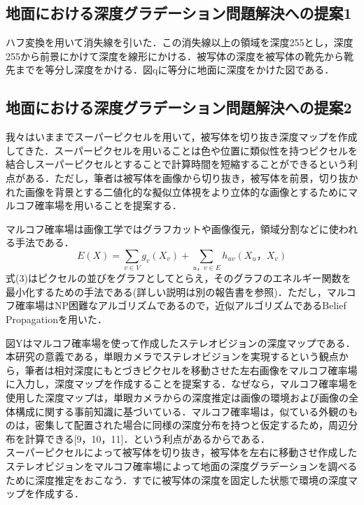 \documentclass[technicalreport]{ieicej}
\begin{document}

\subsection{地面における深度グラデーション問題解決への提案1}
ハフ変換を用いて消失線を引いた．この消失線以上の領域を深度255とし，深度255から前景にかけて深度を線形にかける．被写体の深度を被写体の靴先から靴先までを等分し深度をかける．図qに等分に地面に深度をかけた図である．

\subsection{地面における深度グラデーション問題解決への提案2}
我々はいままでスーパーピクセルを用いて，被写体を切り抜き深度マップを作成してきた．スーパーピクセルを用いることは色や位置に類似性を持つピクセルを結合しスーパーピクセルとすることで計算時間を短縮することができるという利点がある．ただし，筆者は被写体を画像から切り抜き，被写体を前景，切り抜かれた画像を背景とする二値化的な擬似立体視をより立体的な画像とするためにマルコフ確率場を用いることを提案する．

マルコフ確率場は画像工学ではグラフカットや画像復元，領域分割などに使われる手法である．\begin{equation}
E(X)=\sum_{v\in V} g_v(X_v)+\sum_{u，v \in E} h_{uv} (X_u，X_v)
\end{equation}式(3)はピクセルの並びをグラフとしてとらえ，そのグラフのエネルギー関数を最小化するための手法である(詳しい説明は別の報告書を参照)．ただし，マルコフ確率場はNP困難なアルゴリズムであるので，近似アルゴリズムであるBelief Propagationを用いた．


図Yはマルコフ確率場を使って作成したステレオビジョンの深度マップである．本研究の意義である，単眼カメラでステレオビジョンを実現するという観点から，筆者は相対深度にもとづきピクセルを移動させた左右画像をマルコフ確率場に入力し，深度マップを作成することを提案する．なぜなら，マルコフ確率場を使用した深度マップは，単眼カメラからの深度推定は画像の環境および画像の全体構成に関する事前知識に基づいている．マルコフ確率場は，似ている外観のものは，密集して配置された場合に同様の深度分布を持つと仮定するため，周辺分布を計算できる[9，10，11]．という利点があるからである．\\

スーパーピクセルによって被写体を切り抜き，被写体を左右に移動させ作成したステレオビジョンをマルコフ確率場によって地面の深度グラデーションを調べるために深度推定をおこなう．すでに被写体の深度を固定した状態で環境の深度マップを作成する．
\end{document}

